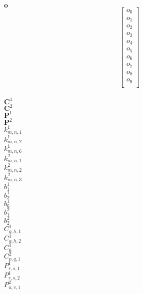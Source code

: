 \documentclass[a4paper,12pt]{article}
\begin{document}

$\boldsymbol{o}$\\[0.2cm]

\begin{equation*}
\begin{bmatrix}
o_{0}\\
o_{1}\\
o_{2}\\
o_{3}\\
o_{4}\\
o_{5}\\
o_{6}\\
o_{7}\\
o_{8}\\
o_{9}\\
\end{bmatrix}
\end{equation*}
\\[0.2cm]
$\boldsymbol{C}^1$\\[0.2cm]
$\boldsymbol{C}^2$\\[0.2cm]
$\boldsymbol{P}^1$\\[0.2cm]
$\boldsymbol{P}^2$\\[0.2cm]
$k^1_{m,n,1}$\\[0.2cm]
$k^1_{m,n,2}$\\[0.2cm]
$k^1_{m,n,6}$\\[0.2cm]
$k^2_{m,n,1}$\\[0.2cm]
$k^2_{m,n,2}$\\[0.2cm]
$k^2_{m,n,3}$\\[0.2cm]
$b^1_1$\\[0.2cm]
$b^1_2$\\[0.2cm]
$b^1_6$\\[0.2cm]
$b^2_1$\\[0.2cm]
$b^2_2$\\[0.2cm]
$C^1_{g,h,1}$\\[0.2cm]
$C^1_{g,h,2}$\\[0.2cm]
$C^1_6$\\[0.2cm]
$C^2_{p,q,1}$\\[0.2cm]
$P^1_{r,s,1}$\\[0.2cm]
$P^1_{r,s,2}$\\[0.2cm]
$P^2_{u,v,1}$\\[0.2cm]

\end{document}
